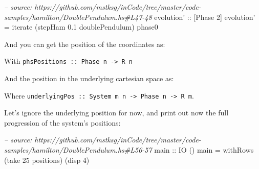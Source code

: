 \documentclass[]{article}
\newenvironment{Shaded}{}{}
\newcommand{\DataTypeTok}[1]{\textcolor[rgb]{0.56,0.13,0.00}{#1}}
\newcommand{\DecValTok}[1]{\textcolor[rgb]{0.25,0.63,0.44}{#1}}
\newcommand{\FloatTok}[1]{\textcolor[rgb]{0.25,0.63,0.44}{#1}}
\newcommand{\CommentTok}[1]{\textcolor[rgb]{0.38,0.63,0.69}{\textit{#1}}}
\newcommand{\OtherTok}[1]{\textcolor[rgb]{0.00,0.44,0.13}{#1}}
\newcommand{\FunctionTok}[1]{\textcolor[rgb]{0.02,0.16,0.49}{#1}}
\newcommand{\NormalTok}[1]{#1}
\begin{document}
\begin{Shaded}
\begin{Highlighting}[]
\CommentTok{-- source: https://github.com/mstksg/inCode/tree/master/code-samples/hamilton/DoublePendulum.hs#L47-48}
\OtherTok{evolution' ::}\NormalTok{ [}\DataTypeTok{Phase} \DecValTok{2}\NormalTok{]}
\NormalTok{evolution' }\FunctionTok{=}\NormalTok{ iterate (stepHam }\FloatTok{0.1}\NormalTok{ doublePendulum) phase0}
\end{Highlighting}
\end{Shaded}

And you can get the position of the coordinates as:

\begin{Shaded}
\end{Shaded}

With \texttt{phsPositions\ ::\ Phase\ n\ -\textgreater{}\ R\ n}

And the position in the underlying cartesian space as:

\begin{Shaded}
\end{Shaded}

Where
\texttt{underlyingPos\ ::\ System\ m\ n\ -\textgreater{}\ Phase\ n\ -\textgreater{}\ R\ m}.

Let's ignore the underlying position for now, and print out now the full
progression of the system's positions:

\begin{Shaded}
\begin{Highlighting}[]
\CommentTok{-- source: https://github.com/mstksg/inCode/tree/master/code-samples/hamilton/DoublePendulum.hs#L56-57}
\OtherTok{main ::} \DataTypeTok{IO}\NormalTok{ ()}
\NormalTok{main }\FunctionTok{=}\NormalTok{ withRows (take }\DecValTok{25}\NormalTok{ positions) (disp }\DecValTok{4}\NormalTok{)}
\end{Highlighting}
\end{Shaded}
\end{document}
